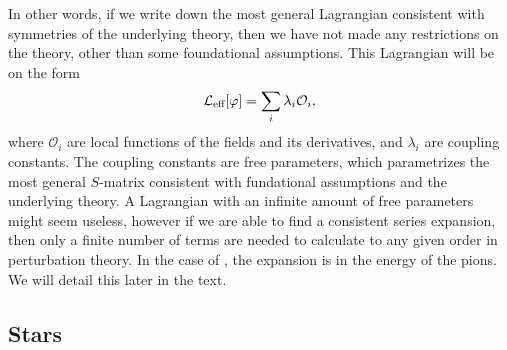 In other words, if we write down the most general Lagrangian consistent with symmetries of the underlying theory, then we have not made any restrictions on the theory, other than some foundational assumptions.
This Lagrangian will be on the form
\begin{equation}
    \mathcal{L}_\text{eff}[\varphi] = \sum_i \lambda_i \mathcal O_i,
\end{equation}
where $\mathcal O_i$ are local functions of the fields and its derivatives, and $\lambda_i$ are coupling constants.
The coupling constants are free parameters, which parametrizes the most general $S$-matrix consistent with fundational assumptions and the underlying theory.
A Lagrangian with an infinite amount of free parameters might seem useless, however if we are able to find a consistent series expansion, then only a finite number of terms are needed to calculate to any given order in perturbation theory.
In the case of \chpt, the expansion is in the energy of the pions.
We will detail this later in the text.


\subsection*{Stars}

